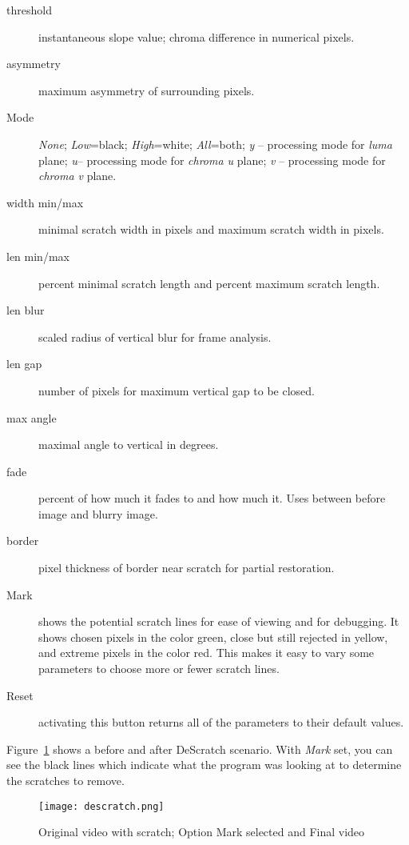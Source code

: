 \begin{description}
    \item[threshold] instantaneous slope value; chroma difference in numerical pixels.
    \item[asymmetry] maximum asymmetry of surrounding
    pixels.
    \item[Mode] \textit{None}; \textit{Low}=black; \textit{High}=white; \textit{All}=both;
    \textit{y} -- processing mode for \textit{luma} plane;
    \textit{u}-- processing mode for \textit{chroma u} plane;
    \textit{v} -- processing mode for \textit{chroma v} plane.
    \item[width min/max] minimal scratch width in pixels and maximum scratch width in pixels.
    \item[len min/max] percent minimal scratch length and percent maximum scratch length.
    \item[len blur] scaled radius of vertical blur for frame
    analysis.
    \item[len gap] number of pixels for maximum vertical gap
    to be closed.
    \item[max angle] maximal angle to vertical in degrees.
    \item[fade] percent of how much it fades to and how much it. Uses between before image and blurry image.
    \item[border] pixel thickness of border near scratch for partial restoration.
    \item[Mark] shows the potential scratch lines for ease of viewing and for debugging. It shows chosen pixels in the color green, close but still rejected in yellow, and extreme pixels in the color red. This makes it easy to vary some parameters to choose more or fewer scratch lines.
    \item[Reset] activating this button returns all of the parameters to their default values.
\end{description}

Figure~\ref{fig:descratch} shows a before and after DeScratch scenario. With \textit{Mark} set, you can see the black lines which indicate what the program was looking at to determine the scratches to remove.

\begin{figure}[htpb]
    \centering
    \texttt{[image: descratch.png]}
    \caption{Original video with scratch; Option Mark selected and Final video}
    \label{fig:descratch}
\end{figure}

